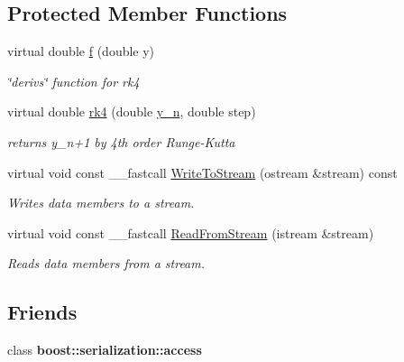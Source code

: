 \subsection*{Protected Member Functions}
\begin{DoxyCompactItemize}
\item 
virtual double \hyperlink{class_t_h_h_kinetics_factor_aa58fa2b2da61a14dd674f22d32a62248}{f} (double y)
\begin{DoxyCompactList}\small\item\em \char`\"{}derivs\char`\"{} function for rk4 \end{DoxyCompactList}\item 
\hypertarget{class_t_h_h_kinetics_factor_a18fa98f40fc608a759f9f50333ca35b9}{virtual double \hyperlink{class_t_h_h_kinetics_factor_a18fa98f40fc608a759f9f50333ca35b9}{rk4} (double \hyperlink{class_t_h_h_kinetics_factor_ab23804a480f61770bddf033f8b71140c}{y\+\_\+n}, double step)}\label{class_t_h_h_kinetics_factor_a18fa98f40fc608a759f9f50333ca35b9}

\begin{DoxyCompactList}\small\item\em returns y\+\_\+n+1 by 4th order Runge-\/\+Kutta \end{DoxyCompactList}\item 
\hypertarget{class_t_h_h_kinetics_factor_a80e5ca6fd5a40bc23dd83827bdea9be4}{virtual void const \+\_\+\+\_\+fastcall \hyperlink{class_t_h_h_kinetics_factor_a80e5ca6fd5a40bc23dd83827bdea9be4}{Write\+To\+Stream} (ostream \&stream) const }\label{class_t_h_h_kinetics_factor_a80e5ca6fd5a40bc23dd83827bdea9be4}

\begin{DoxyCompactList}\small\item\em Writes data members to a stream. \end{DoxyCompactList}\item 
\hypertarget{class_t_h_h_kinetics_factor_adac3677024c5acc76e92e4c80dbe536b}{virtual void const \+\_\+\+\_\+fastcall \hyperlink{class_t_h_h_kinetics_factor_adac3677024c5acc76e92e4c80dbe536b}{Read\+From\+Stream} (istream \&stream)}\label{class_t_h_h_kinetics_factor_adac3677024c5acc76e92e4c80dbe536b}

\begin{DoxyCompactList}\small\item\em Reads data members from a stream. \end{DoxyCompactList}\end{DoxyCompactItemize}
\subsection*{Friends}
\begin{DoxyCompactItemize}
\item 
\hypertarget{class_t_h_h_kinetics_factor_ac98d07dd8f7b70e16ccb9a01abf56b9c}{class {\bfseries boost\+::serialization\+::access}}\label{class_t_h_h_kinetics_factor_ac98d07dd8f7b70e16ccb9a01abf56b9c}

\end{DoxyCompactItemize}


